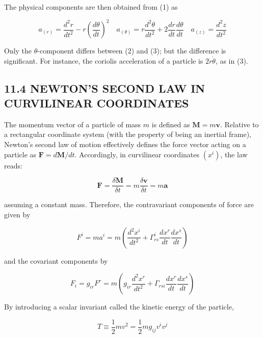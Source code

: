 \documentclass[10pt]{article}
\begin{document}
The physical components are then obtained from (1) as


\begin{equation*}
a_{(r)}=\frac{d^{2} r}{d t^{2}}-r\left(\frac{d \theta}{d t}\right)^{2} \quad a_{(\theta)}=r \frac{d^{2} \theta}{d t^{2}}+2 \frac{d r}{d t} \frac{d \theta}{d t} \quad a_{(z)}=\frac{d^{2} z}{d t^{2}} \tag{3}
\end{equation*}


Only the $\theta$-component differs between (2) and (3); but the difference is significant. For instance, the coriolis acceleration of a particle is $2 \dot{r} \dot{\theta}$, as in (3).

\subsection*{11.4 NEWTON'S SECOND LAW IN CURVILINEAR COORDINATES}
The momentum vector of a particle of mass $m$ is defined as $\mathbf{M}=m \mathbf{v}$. Relative to a rectangular coordinate system (with the property of being an inertial frame), Newton's second law of motion effectively defines the force vector acting on a particle as $\mathbf{F}=d \mathbf{M} / d t$. Accordingly, in curvilinear coordinates $\left(x^{i}\right)$, the law reads:


\begin{equation*}
\mathbf{F}=\frac{\delta \mathbf{M}}{\delta t}=m \frac{\delta \mathbf{v}}{\delta t}=m \mathbf{a} \tag{11.11}
\end{equation*}


assuming a constant mass. Therefore, the contravariant components of force are given by


\begin{equation*}
F^{i}=m a^{i}=m\left(\frac{d^{2} x^{i}}{d t^{2}}+\Gamma_{r s}^{i} \frac{d x^{r}}{d t} \frac{d x^{s}}{d t}\right) \tag{11.12a}
\end{equation*}


and the covariant components by


\begin{equation*}
F_{i}=g_{i r} F^{r}=m\left(g_{i r} \frac{d^{2} x^{r}}{d t^{2}}+\Gamma_{r s i} \frac{d x^{r}}{d t} \frac{d x^{s}}{d t}\right) \tag{11.12b}
\end{equation*}


By introducing a scalar invariant called the kinetic energy of the particle,

$$
T \equiv \frac{1}{2} m v^{2}=\frac{1}{2} m g_{i j} v^{i} v^{j}
$$
\end{document}
